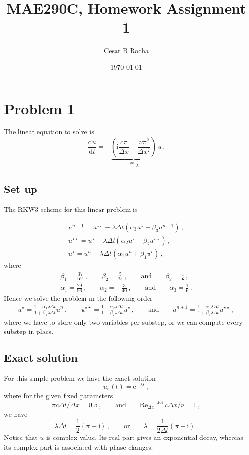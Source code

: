 \documentclass[11pt]{article}
\title{MAE290C, Homework Assignment 1}
\author{Cesar B Rocha}
\date{\today}
\newcommand{\defn}{\stackrel{\text{def}}{=}}
\newcommand{\ii}{\mathrm{i}}
\newcommand{\dd}{\mathrm{d}}
\newcommand{\ee}{\mathrm{e}}
\newcommand{\dstar}{{\star\star}}
\newcommand{\dt}{\Delta t}
\newcommand{\dx}{\Delta x}
\newcommand{\com}{\, ,}
\newcommand{\per}{\, .}
\newcommand{\qqand}{\qquad \text{and} \qquad}
\def\beq{\begin{equation}}
\def\eeq{\end{equation}}
\begin{document}
\maketitle

\section*{Problem 1}
The linear equation to solve is
\beq
\label{eq:pb1_eqn1}
\frac{\dd u}{\dd t} = -\underbrace{\left(\ii \frac{c \pi}{\Delta x} + \frac{\nu \pi^2}{\Delta x^2}\right)}_{\defn \lambda}\,u\per
\eeq

\subsection*{Set up}
The RKW3 scheme for this linear problem is

\begin{align}
u^{n+1} = u^\dstar - \lambda \dt(\alpha_3 u^\star + \beta_3 u^{n+1})\com \nonumber \\
u^\dstar = u^\star - \lambda \dt(\alpha_2 u^\star + \beta_2 u^\dstar)\com \nonumber \\
u^\star = u^n - \lambda \dt (\alpha_1 u^n + \beta_1 u^\star)\com
\end{align}
where
\begin{align}
\beta_1 = \frac{37}{160}\com\qquad \beta_2 = \frac{5}{24}\com\qqand \beta_3 = \frac{1}{6}\com \nonumber \\
\alpha_1 = \frac{29}{96}\com\qquad \alpha_2 = -\frac{3}{40}\com\qqand \alpha_3 = \frac{1}{6}\per
\end{align}
Hence we solve the problem in the following order\begin{align}
u^\star = \frac{1 -  \alpha_1 \lambda\dt}{1+ \beta_1 \lambda\dt} u^n \com\qquad u^\dstar = \frac{1 -  \alpha_2 \lambda\dt}{1+\beta_2\lambda  \dt} u^\star \com\qqand u^{n+1} = \frac{1 - \alpha_3 \lambda \dt}{1+\beta_3 \lambda \dt} u^\dstar \com
\end{align}
where  we have to store only two variables per substep, or we can compute every substep in place.

\subsection*{Exact solution}
For this simple problem we have the exact solution
\beq
u_e (t) = \ee^{-\lambda t}\com
\eeq
where for the given fixed parameters
\beq
\pi c \dt/\dx = 0.5\com\qqand \text{Re}_{\dx} \defn c \dx/\nu = 1\com
\eeq
we have
\beq
\label{eq:lamdt}
\lambda\dt = \frac{1}{2} \left( \pi + \ii \right)\com\qquad \text{or}\qquad \lambda = \frac{1}{2\dt}\left(\pi + \ii\right)\per
\eeq
Notice that $u$ is complex-value. Its real part gives an exponential decay, whereas its complex part is associated with phase changes.
\end{document}
